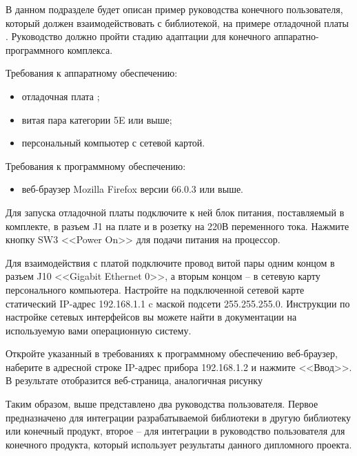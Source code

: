 В данном подразделе будет описан пример руководства конечного пользователя,
который должен взаимодействовать с библиотекой, на примере отладочной платы
. Руководство должно пройти стадию адаптации для конечного
аппаратно-программного комплекса.

Требования к аппаратному обеспечению:
\begin{itemize}
    \item отладочная плата ;
    \item витая пара категории 5E или выше;
    \item персональный компьютер с сетевой картой.
\end{itemize}

Требования к программному обеспечению:
\begin{itemize}
    \item веб-браузер Mozilla Firefox версии 66.0.3 или выше.
\end{itemize}

Для запуска отладочной платы подключите к ней блок питания, поставляемый в
комплекте, в разъем J1 на плате и в розетку на 220В переменного тока.
Нажмите кнопку SW3 <<Power On>> для подачи питания на процессор.

Для взаимодействия с платой подключите провод витой пары одним концом в разъем J10
<<Gigabit Ethernet 0>>, а вторым концом -- в сетевую карту персонального компьютера.
Настройте на подключенной сетевой карте статический IP-адрес 192.168.1.1 c
маской подсети 255.255.255.0. Инструкции по настройке сетевых интерфейсов вы можете
найти в документации на используемую вами операционную систему.

Откройте указанный в требованиях к программному обеспечению веб-браузер,
наберите в адресной строке IP-адрес прибора 192.168.1.2 и нажмите <<Ввод>>.
В результате отобразится веб-страница, аналогичная
рисунку%


Таким образом, выше представлено два руководства пользователя. Первое
предназначено для интеграции разрабатываемой библиотеки в другую библиотеку
или конечный продукт, второе -- для интеграции в руководство пользователя для
конечного продукта, который использует результаты данного дипломного проекта.
